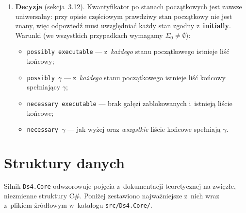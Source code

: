 \documentclass[11pt,a4paper]{article}
\begin{document}
\begin{enumerate}
        się \emph{liściem końcowym}.
  \item \textbf{Decyzja} (sekcja~3.12). Kwantyfikator po stanach początkowych
        jest zawsze uniwersalny: przy opisie częściowym prawdziwy stan początkowy
        nie jest znany, więc odpowiedź musi uwzględniać każdy stan zgodny
        z~\textbf{initially}. Warunki (we wszystkich przypadkach wymagamy
        $\Sigma_0 \neq \emptyset$):
        \begin{itemize}
          \item \texttt{possibly executable} --- z~\emph{każdego} stanu
                początkowego istnieje liść końcowy;
          \item \texttt{possibly $\gamma$} --- z~\emph{każdego} stanu
                początkowego istnieje liść końcowy spełniający $\gamma$;
          \item \texttt{necessary executable} --- brak gałęzi zablokowanych
                i~istnieją liście końcowe;
          \item \texttt{necessary $\gamma$} --- jak wyżej oraz \emph{wszystkie}
                liście końcowe spełniają $\gamma$.
        \end{itemize}
\end{enumerate}

\section{Struktury danych}
\label{sec:struktury}

Silnik \texttt{Ds4.Core} odwzorowuje pojęcia z~dokumentacji teoretycznej na
zwięzłe, niezmienne struktury C\#. Poniżej zestawiono najważniejsze z~nich wraz
z~plikiem źródłowym w~katalogu \texttt{src/Ds4.Core/}.
\end{document}
